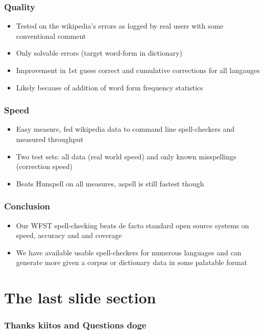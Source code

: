 \documentclass[t,12pt]{beamer}
\begin{document}
\begin{frame}
    \frametitle{Quality}
    \begin{itemize}
        \item Tested on the wikipedia's errors as logged by real users with
            some conventional comment
        \item Only solvable errors (target word-form in dictionary)
        \item Improvement in 1st guess correct and cumulative corrections
            for all langauges
        \item Likely because of addition of word form frequency statistics
    \end{itemize}
\end{frame}

\begin{frame}
    \frametitle{Speed}
    \begin{itemize}
        \item Easy measure, fed wikipedia data to command line spell-checkers
            and measured throughput
        \item Two test sets: all data (real world speed) and only known
            misspellings (correction speed)
        \item Beats Hunspell on all measures, aspell is still fastest though
    \end{itemize}
\end{frame}

\begin{frame}
    \frametitle{Conclusion}
    \begin{itemize}
        \item Our WFST spell-checking beats de facto standard open source
            systems on speed, accuracy and and coverage
        \item We have available usable spell-checkers for numerous languages
            and can generate more given a corpus or dictionary data in some
            palatable format
    \end{itemize}
\end{frame}

\section{The last slide section}

\begin{frame}
    \frametitle{Thanks kiitos  and Questions doge}
\end{frame}
\end{document}
